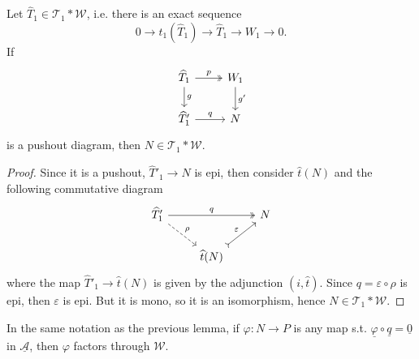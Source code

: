 \begin{lemma}
  Let $\widehat{T}_1\in\mathcal{T}_1\ast\mathcal{W}$, i.e. there is an exact sequence
  \begin{equation*}
    0\to t_1(\widehat{T}_1)\to \widehat{T}_1\to W_1\to 0.
  \end{equation*}
  If
  \begin{equation*}
    \begin{tikzcd}
      \widehat{T}_1\arrow[two heads]{r}{p}\arrow{d}{g}
        & W_1\arrow{d}{g'} \\
      \widehat{T}'_1\arrow{r}{q}&N
    \end{tikzcd}
  \end{equation*}
  is a pushout diagram, then $N\in\mathcal{T}_1\ast\mathcal{W}$.
\end{lemma}

\begin{proof}
  Since it is a pushout, $\widehat{T}'_1 \to N$ is epi, then consider $\widehat{t}(N)$
  and the following commutative diagram
  \begin{equation*}
    \begin{tikzcd}
      \widehat{T}'_1\arrow[two heads]{rr}{q} \arrow[dashed]{dr}{\rho}
        & & N\\
        & \widehat{t}(N)\arrow[tail]{ur}{\varepsilon}
          &
    \end{tikzcd}
  \end{equation*}
  where the map $\widehat{T}'_1\to \widehat{t}(N)$ is given by the adjunction $(i,\widehat{t})$.
  Since $q=\varepsilon\circ\rho$ is epi, then $\varepsilon$ is epi. But it is mono, so it is an isomorphism,
  hence $N\in\mathcal{T}_1\ast\mathcal{W}$.
\end{proof}

\begin{lemma}
  In the same notation as the previous lemma, if $\varphi:N\to P$ is any map s.t. $\underline{\varphi}\circ \underline{q} = \underline{0}$ in
  $\underline{\mathcal{A}}$, then $\varphi$ factors through $\mathcal{W}$.
\end{lemma}

